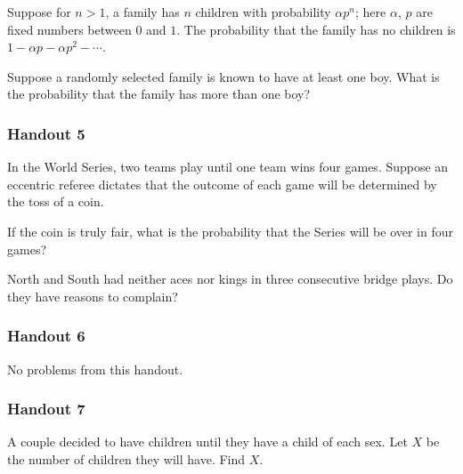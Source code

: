 \begin{problem}[Handout 4, \# 16]
  Suppose for \(n>1\), a family has \(n\) children with probability
  \(\alpha p^n\); here \(\alpha\), \(p\) are fixed numbers between \(0\)
  and \(1\). The probability that the family has no children is \(1-\alpha
  p-\alpha p^2-\dotsb\).

  \noindent Suppose a randomly selected family is known to have at least
  one boy. What is the probability that the family has more than one boy?
\end{problem}
\begin{solution*}
\end{solution*}

\subsubsection{Handout 5}
\begin{problem}[Handout 5, \# 6]
  In the World Series, two teams play until one team wins four
  games. Suppose an eccentric referee dictates that the outcome of each
  game will be determined by the toss of a coin.

  \noindent If the coin is truly fair, what is the probability that the
  Series will be over in four games?
\end{problem}
\begin{solution*}
\end{solution*}

\begin{problem}[Handout 5, \# 14]
  North and South had neither aces nor kings in three consecutive bridge
  plays. Do they have reasons to complain?
\end{problem}
\begin{solution*}
\end{solution*}

\subsubsection{Handout 6}
No problems from this handout.

\subsubsection{Handout 7}
\begin{problem}[Handout 7, \# 5]
  A couple decided to have children until they have a child of each
  sex. Let \(X\) be the number of children they will have. Find \(X\).
\end{problem}
\begin{solution*}
\end{solution*}

